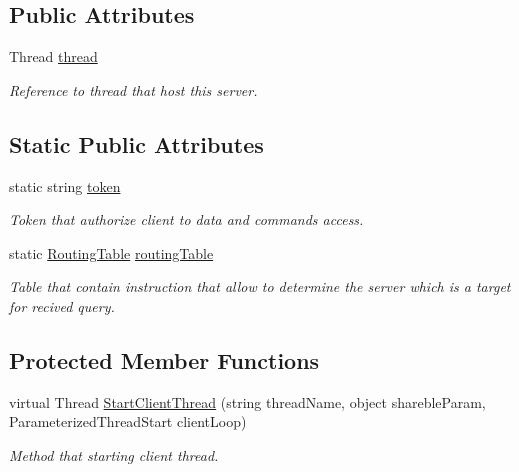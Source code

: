 \subsection*{Public Attributes}
\begin{DoxyCompactItemize}
\item 
Thread \mbox{\hyperlink{class_uniform_client_1_1_base_client_a458271823ca5e21612c0947e1db695a0}{thread}}
\begin{DoxyCompactList}\small\item\em Reference to thread that host this server. \end{DoxyCompactList}\end{DoxyCompactItemize}
\subsection*{Static Public Attributes}
\begin{DoxyCompactItemize}
\item 
static string \mbox{\hyperlink{class_uniform_client_1_1_base_client_ad99bcf3d1afeed6eadca7035c926d2b7}{token}}
\begin{DoxyCompactList}\small\item\em Token that authorize client to data and commands access. \end{DoxyCompactList}\item 
static \mbox{\hyperlink{class_pipes_provider_1_1_networking_1_1_routing_1_1_routing_table}{Routing\+Table}} \mbox{\hyperlink{class_uniform_client_1_1_base_client_a33b34ea9a2d7b4b8e26af767ab2897cf}{routing\+Table}}
\begin{DoxyCompactList}\small\item\em Table that contain instruction that allow to determine the server which is a target for recived query. \end{DoxyCompactList}\end{DoxyCompactItemize}
\subsection*{Protected Member Functions}
\begin{DoxyCompactItemize}
\item 
virtual Thread \mbox{\hyperlink{class_uniform_client_1_1_base_client_a194b46bb0e889d07cade81c0aeab7cea}{Start\+Client\+Thread}} (string thread\+Name, object shareble\+Param, Parameterized\+Thread\+Start client\+Loop)
\begin{DoxyCompactList}\small\item\em Method that starting client thread. \end{DoxyCompactList}\end{DoxyCompactItemize}
